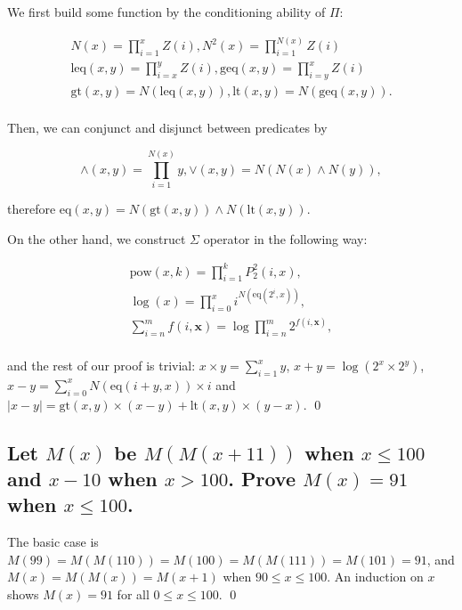 \documentclass[11pt]{article}
\newcommand{\eq}{\mathrm{eq}}
\begin{document}
\begin{pf} \rm
  We first build some function by the conditioning ability of $\Pi$:

\[
 \begin{array}{c}
  \displaystyle N(x) = \prod_{i=1}^{x} Z(i), N^2(x) = \prod_{i=1}^{N(x)} Z(i) \\
  \displaystyle \mathrm{leq}(x, y) = \prod_{i = x}^y Z(i), 
  \displaystyle \mathrm{geq}(x, y) = \prod_{i = y}^x Z(i) \\
  \displaystyle \mathrm{gt}(x, y) = N(\mathrm{leq}(x, y)), 
  \displaystyle \mathrm{lt}(x, y) = N(\mathrm{geq}(x, y)). \\
 \end{array}
\]

  Then, we can conjunct and disjunct between predicates by

\[
  \mathrm{\land}(x, y) = \prod_{i = 1}^{N(x)} y, 
  \mathrm{\lor}(x, y) = N( N(x) \land N(y) ),
\]

\noindent therefore $\mathrm{eq}(x, y) = N(\mathrm{gt}(x, y)) \land N(\mathrm{lt}(x, y))$.

On the other hand,  we construct $\Sigma$ operator in the following way:

\[
 \begin{array}{c}
    \displaystyle \mathrm{pow}(x, k)  = \prod_{i = 1}^{k} P_2^2(i, x), \\
    \displaystyle \log (x) = \prod_{i = 0}^{x} i^{N(\mathrm{eq}(2^i, x))}, \\
    \displaystyle \sum_{i=n}^{m} f(i, \mathbf{x}) = \log \prod_{i=n}^{m} 2^{f(i, \mathbf{x})}, \\
 \end{array}
\]

\noindent and the rest of our proof is trivial:
  $\displaystyle x\times y = \sum_{i = 1}^x y$, 
  $\displaystyle x + y = \log \left( 2^{x} \times 2^y \right)$, 
  $\displaystyle x - y = \sum_{i = 0}^x N(\eq(i + y, x)) \times i$ and 
  $\displaystyle |x-y| = \mathrm{gt}(x, y) \times (x - y) + \mathrm{lt}(x, y) \times (y - x)$. \qed

\end{pf}


\subsection{Let $M(x)$ be $M(M(x+11))$ when $x\leq 100$ and $x-10$ when $x>100$.
Prove $M(x)=91$ when $x\leq 100$.}
\begin{pf} \rm
The basic case is $M(99) = M(M(110)) = M(100) = M(M(111)) = M(101) = 91$, and
$M(x) = M(M(x)) = M(x + 1)$ when $90 \leq x \leq 100$.
An induction on $x$ shows $M(x)=91$ for all $0\leq x\leq 100$. \qed
\end{pf}
\end{document}
